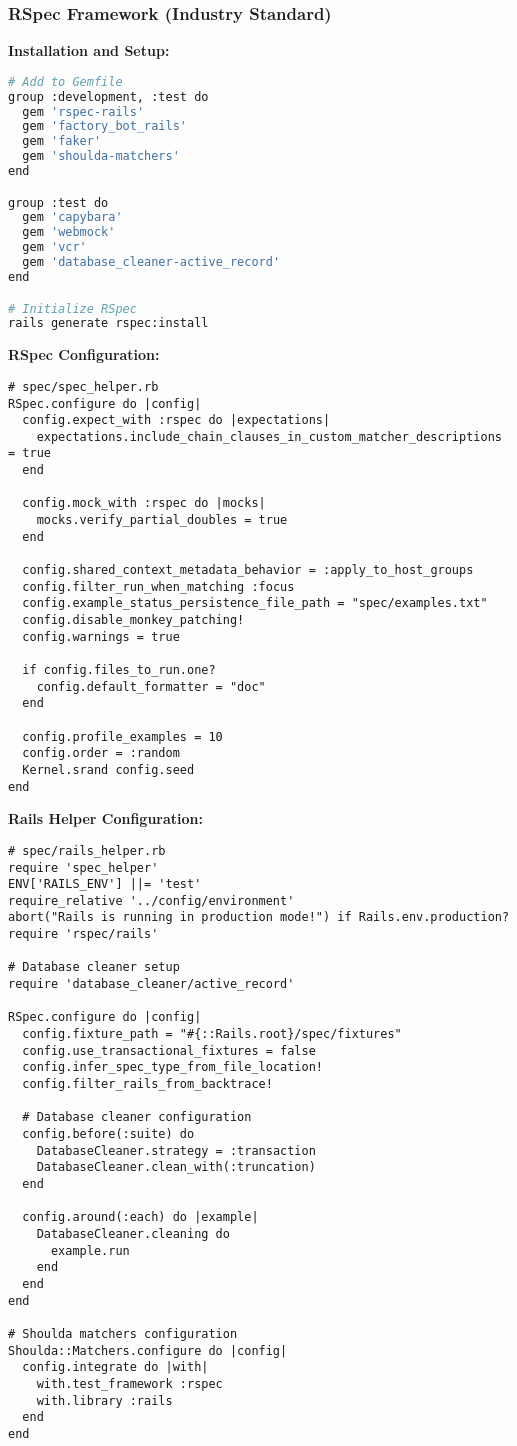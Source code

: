 \documentclass[12pt,a4paper]{article}
\begin{document}
\subsubsection{RSpec Framework (Industry Standard)}

\textbf{Installation and Setup:}
\begin{lstlisting}[language=bash]
# Add to Gemfile
group :development, :test do
  gem 'rspec-rails'
  gem 'factory_bot_rails'
  gem 'faker'
  gem 'shoulda-matchers'
end

group :test do
  gem 'capybara'
  gem 'webmock'
  gem 'vcr'
  gem 'database_cleaner-active_record'
end

# Initialize RSpec
rails generate rspec:install
\end{lstlisting}

\textbf{RSpec Configuration:}
\begin{lstlisting}
# spec/spec_helper.rb
RSpec.configure do |config|
  config.expect_with :rspec do |expectations|
    expectations.include_chain_clauses_in_custom_matcher_descriptions = true
  end

  config.mock_with :rspec do |mocks|
    mocks.verify_partial_doubles = true
  end

  config.shared_context_metadata_behavior = :apply_to_host_groups
  config.filter_run_when_matching :focus
  config.example_status_persistence_file_path = "spec/examples.txt"
  config.disable_monkey_patching!
  config.warnings = true
  
  if config.files_to_run.one?
    config.default_formatter = "doc"
  end
  
  config.profile_examples = 10
  config.order = :random
  Kernel.srand config.seed
end
\end{lstlisting}

\textbf{Rails Helper Configuration:}
\begin{lstlisting}
# spec/rails_helper.rb
require 'spec_helper'
ENV['RAILS_ENV'] ||= 'test'
require_relative '../config/environment'
abort("Rails is running in production mode!") if Rails.env.production?
require 'rspec/rails'

# Database cleaner setup
require 'database_cleaner/active_record'

RSpec.configure do |config|
  config.fixture_path = "#{::Rails.root}/spec/fixtures"
  config.use_transactional_fixtures = false
  config.infer_spec_type_from_file_location!
  config.filter_rails_from_backtrace!

  # Database cleaner configuration
  config.before(:suite) do
    DatabaseCleaner.strategy = :transaction
    DatabaseCleaner.clean_with(:truncation)
  end

  config.around(:each) do |example|
    DatabaseCleaner.cleaning do
      example.run
    end
  end
end

# Shoulda matchers configuration
Shoulda::Matchers.configure do |config|
  config.integrate do |with|
    with.test_framework :rspec
    with.library :rails
  end
end
\end{lstlisting}
\end{document}
